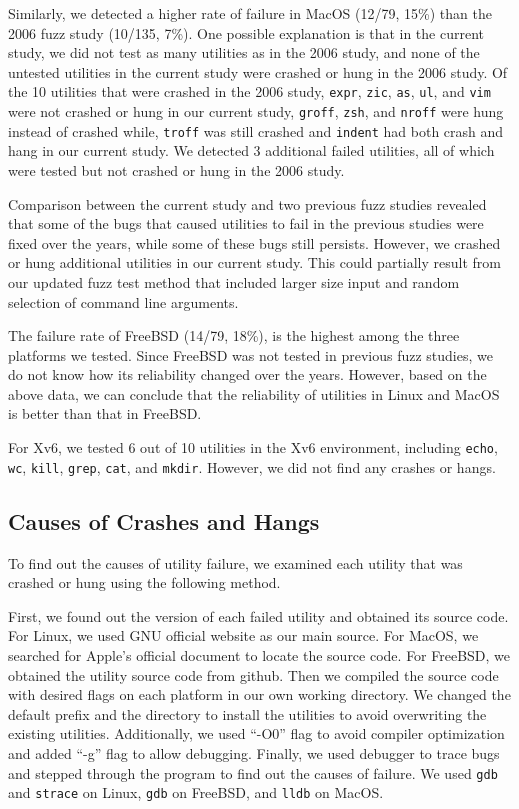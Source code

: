 Similarly, we detected a higher rate of failure in MacOS (12/79, 15\%) than the 2006 fuzz study (10/135, 7\%). One possible explanation is that in the current study, we did not test as many utilities as in the 2006 study, and none of the untested utilities in the current study were crashed or hung in the 2006 study. Of the 10 utilities that were crashed in the 2006 study, \texttt{expr}, \texttt{zic}, \texttt{as}, \texttt{ul}, and \texttt{vim} were not crashed or hung in our current study, \texttt{groff}, \texttt{zsh}, and \texttt{nroff} were hung instead of crashed while, \texttt{troff} was still crashed and \texttt{indent} had both crash and hang in our current study. We detected 3 additional failed utilities, all of which were tested but not crashed or hung in the 2006 study.

Comparison between the current study and two previous fuzz studies revealed that some of the bugs that caused utilities to fail in the previous studies were fixed over the years, while some of these bugs still persists. However, we crashed or hung additional utilities in our current study. This could partially result from our updated fuzz test method that included larger size input and random selection of command line arguments.

The failure rate of FreeBSD (14/79, 18\%), is the highest among the three platforms we tested. Since FreeBSD was not tested in previous fuzz studies, we do not know how its reliability changed over the years. However, based on the above data, we can conclude that the reliability of utilities in Linux and MacOS is better than that in FreeBSD.

For Xv6, we tested 6 out of 10 utilities in the Xv6 environment, including \texttt{echo}, \texttt{wc}, \texttt{kill}, \texttt{grep}, \texttt{cat}, and \texttt{mkdir}. However, we did not find any crashes or hangs.



\subsection{Causes of Crashes and Hangs}
To find out the causes of utility failure, we examined each utility that was crashed or hung using the following method. 

First, we found out the version of each failed utility and obtained its source code. For Linux, we used GNU official website as our main source. For MacOS, we searched for Apple’s official document to locate the source code. For FreeBSD, we obtained the utility source code from github. Then we compiled the source code with desired flags on each platform in our own working directory. We changed the default prefix and the directory to install the utilities to avoid overwriting the existing utilities. Additionally, we used “-O0” flag to avoid compiler optimization and added “-g” flag to allow debugging. Finally, we used debugger to trace bugs and stepped through the program to find out the causes of failure. We used \texttt{gdb} and \texttt{strace} on Linux, \texttt{gdb} on FreeBSD, and \texttt{lldb} on MacOS. 

